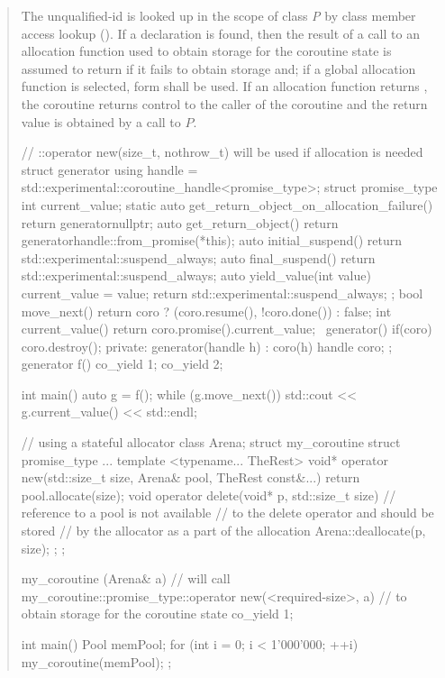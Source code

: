 \begin{quote}
\pnum
The unqualified-id  is looked up in the scope of class \textit{P}
by class member access lookup (). If a declaration is found, then the result of a call to an allocation function used to obtain storage for the coroutine state is assumed to return  if it fails to obtain storage and; if a global allocation function is selected,  form shall be used.
If an allocation function returns , the coroutine returns control to the caller of the coroutine and the return value is obtained by a call to $P$.

\enterexample
\begin{codeblock}
// ::operator new(size_t, nothrow_t) will be used if allocation is needed
struct generator {
  using handle = std::experimental::coroutine_handle<promise_type>;
  struct promise_type {
    int current_value;
    static auto get_return_object_on_allocation_failure() { return generator{nullptr}; }
    auto get_return_object() { return generator{handle::from_promise(*this)}; }
    auto initial_suspend() { return std::experimental::suspend_always{}; }
    auto final_suspend() { return std::experimental::suspend_always{}; }
    auto yield_value(int value) { 
      current_value = value; 
      return std::experimental::suspend_always{};
    }
  };
  bool move_next() { return coro ? (coro.resume(), !coro.done()) : false; }
  int current_value() { return coro.promise().current_value; }
  ~generator() { if(coro) coro.destroy(); }
private:
  generator(handle h) : coro(h) {}
  handle coro;
};
generator f() { co_yield 1;  co_yield 2; }
 
int main() {
  auto g = f();
  while (g.move_next()) std::cout << g.current_value() << std::endl;
}

\end{codeblock}
\exitexample

\pnum
\enterexample
\begin{codeblock}
  // using a stateful allocator
  class Arena;
  struct my_coroutine {
    struct promise_type {
      ...
      template <typename... TheRest>
      void* operator new(std::size_t size, Arena& pool, TheRest const&...) {
        return pool.allocate(size);
      }
      void operator delete(void* p, std::size_t size) {
      	// reference to a pool is not available
      	// to the delete operator and should be stored
      	// by the allocator as a part of the allocation
        Arena::deallocate(p, size);
      }
    };
  };
  
  my_coroutine (Arena& a) {
    // will call my_coroutine::promise_type::operator new(<required-size>, a)
    // to obtain storage for the coroutine state
    co_yield 1;
  }
  
  int main() {
    Pool memPool;
    for (int i = 0; i < 1'000'000; ++i) my_coroutine(memPool);
  };
\end{codeblock}
\exitexample
\end{quote}